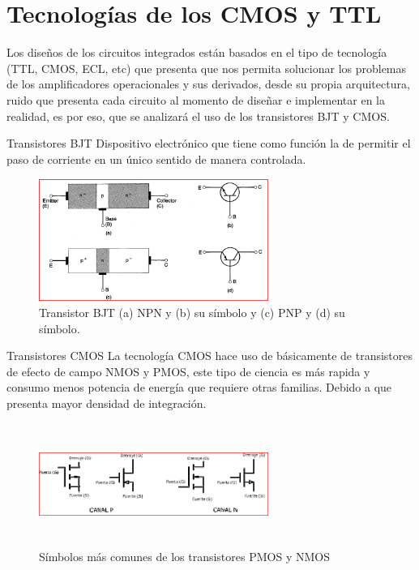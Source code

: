 \documentclass[a4paper]{article} %
\begin{document}
	
\newpage
	
	
\setlength{\parindent}{0pt} %
	


\section{Tecnologías de los CMOS y TTL}

Los diseños de los circuitos integrados están basados en el tipo de tecnología (TTL, CMOS, ECL, etc) que presenta que nos permita solucionar los problemas de los amplificadores operacionales y sus derivados, desde su propia arquitectura, ruido que presenta cada circuito al momento de diseñar e implementar en la realidad, es por eso, que se analizará el uso de los transistores BJT y CMOS.
	\begin{paragraph}{Transistores BJT}
		Dispositivo electrónico que tiene como función la de permitir el paso de corriente en un único sentido de manera controlada.
		\begin{figure}[H]
			\centering
			\includegraphics[width=7.5cm,height=4cm]{IMAGENES/1.PNG}
			\caption{Transistor BJT (a) NPN y (b) su símbolo y (c) PNP y (d) su símbolo. \cite{1}}
			\label{f_1}
		\end{figure}
	\end{paragraph}



	\begin{paragraph}{Transistores CMOS}
		La tecnología CMOS hace uso de básicamente de transistores de efecto de campo NMOS y PMOS, este tipo de ciencia es más rapida y consumo menos potencia de energía que requiere otras familias. Debido a que presenta mayor densidad de integración.  
		\begin{figure}[!h]
			\centering
			\includegraphics[width=7.5cm,height=4cm]{IMAGENES/2.PNG}
			\caption{Símbolos más comunes de los transistores PMOS y NMOS \cite{2}}
			\label{f_2}
		\end{figure}
	\end{paragraph}
\end{document}
